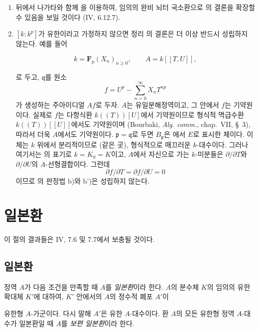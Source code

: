 \begin{remarks}[22.7.7]
\label{0.22.7.7-ko}
\begin{enumerate}
  \item[(i)] 뒤에서 나가타와 함께 을 이용하여,
  임의의 완비 뇌터 국소환으로 의 결론을 확장할
  수 있음을 보일 것이다 (IV, 6.12.7).

  \item[(ii)] $[k:k^p]$가 유한이라고 가정하지 않으면 정리
  의 결론은 더 이상 반드시 성립하지 않는다.
  예를 들어
  
  \[
    k=\mathbf F_p(X_n)_{n\geqslant0},\qquad
    A=k[[T,U]],
  \]
  
  로 두고, $\mathfrak q$를 원소
  \[
    f=U^p-\sum_{n=0}^{\infty}X_nT^{np}
  \]
  가 생성하는 주아이디얼 $Af$로 두자. $A$는 유일분해정역이고,
  그 안에서 $f$는 기약원이다. 실제로 $f$는 다항식환
  $k((T))[U]$에서 기약원이므로 형식적 멱급수환
  $k((T))[[U]]$에서도 기약원이며 (Bourbaki,
  \emph{Alg. comm.}, chap.~VII, §~3), 따라서 더욱 $A$에서도
  기약원이다. $\mathfrak p=\mathfrak q$로 두면
  $B_{\mathfrak p}$은 에서 $E$로 표시한 체이다.
  이 체는 $k$ 위에서 분리적이므로 (같은 곳), 형식적으로 매끄러운
  $k$-대수이다. 그러나 여기서는 의 표기로
  $k=K_0=K$이고, $A$에서 자신으로 가는 $k$-미분들은
  $\partial/\partial T$와 $\partial/\partial U$의 $A$-선형결합이다.
  그런데
  \[
    \partial f/\partial T=\partial f/\partial U=0
  \]
  이므로 의 판정법 b)와 b')은 성립하지 않는다.
\end{enumerate}
\end{remarks}

\section{일본환}
\label{section:0.23-ko}

이 절의 결과들은 IV, 7.6 및 7.7에서 보충될 것이다.

\subsection{일본환}
\label{subsection:0.23.1-ko}

\begin{definition}[23.1.1]
\label{0.23.1.1-ko}
정역 $A$가 다음 조건을 만족할 때 $A$를 \emph{일본환}이라 한다.
$A$의 분수체 $K$의 임의의 유한 확대체 $K'$에 대하여, $K'$ 안에서의
$A$의 정수적 폐포 $A'$이


유한형 $A$-가군이다. 다시 말해 $A'$은 유한 $A$-대수이다. 환 $A$의
모든 유한형 정역 $A$-대수가 일본환일 때 $A$를 \emph{보편 일본환}이라
한다.
\end{definition}

